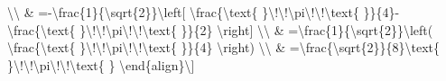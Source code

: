 \textbackslash\textbackslash{} \& =-\textbackslash frac\{1\}\{\textbackslash sqrt\{2\}\}\textbackslash left{[}
\textbackslash frac\{\textbackslash text\{ \}\textbackslash !\textbackslash !\textbackslash pi\textbackslash !\textbackslash !\textbackslash text\{
\}\}\{4\}-\textbackslash frac\{\textbackslash text\{ \}\textbackslash !\textbackslash !\textbackslash pi\textbackslash !\textbackslash !\textbackslash text\{
\}\}\{2\} \textbackslash right{]} \textbackslash\textbackslash{}
\& =\textbackslash frac\{1\}\{\textbackslash sqrt\{2\}\}\textbackslash left(
\textbackslash frac\{\textbackslash text\{ \}\textbackslash !\textbackslash !\textbackslash pi\textbackslash !\textbackslash !\textbackslash text\{
\}\}\{4\} \textbackslash right) \textbackslash\textbackslash{}
\& =\textbackslash frac\{\textbackslash sqrt\{2\}\}\{8\}\textbackslash text\{
\}\textbackslash !\textbackslash !\textbackslash pi\textbackslash !\textbackslash !\textbackslash text\{
\} \textbackslash end\{align\}\textbackslash{]}